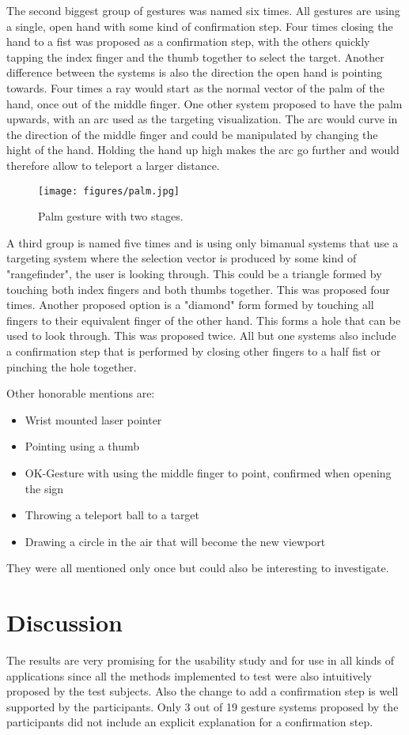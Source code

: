 The second biggest group of gestures was named six times. All gestures are using a single, open hand with some kind of confirmation step. Four times closing the hand to a fist was proposed as a confirmation step, with the others quickly tapping the index finger and the thumb together to select the target. Another difference between the systems is also the direction the open hand is pointing towards. Four times a ray would start as the normal vector of the palm of the hand, once out of the middle finger. One other system proposed to have the palm upwards, with an arc used as the targeting visualization. The arc would curve in the direction of the middle finger and could be manipulated by changing the hight of the hand. Holding the hand up high makes the arc go further and would therefore allow to teleport a larger distance.

\begin{figure}[hbt!]
    \centering
    \texttt{[image: figures/palm.jpg]}
    \caption{Palm gesture with two stages.}
    \label{fig:index2}
\end{figure}

A third group is named five times and is using only bimanual systems that use a targeting system where the selection vector is produced by some kind of "rangefinder", the user is looking through. This could be a triangle formed by touching both index fingers and both thumbs together. This was proposed four times. Another proposed option is a "diamond" form formed by touching all fingers to their equivalent finger of the other hand. This forms a hole that can be used to look through. This was proposed twice. All but one systems also include a confirmation step that is performed by closing other fingers to a half fist or pinching the hole together.

Other honorable mentions are:
\begin{itemize}
    \item Wrist mounted laser pointer
    \item Pointing using a thumb
    \item OK-Gesture with using the middle finger to point, confirmed when opening the sign
    \item Throwing a teleport ball to a target
    \item Drawing a circle in the air that will become the new viewport
\end{itemize}

They were all mentioned only once but could also be interesting to investigate.

\section{Discussion}
The results are very promising for the usability study and for use in all kinds of applications since all the methods implemented to test were also intuitively proposed by the test subjects. Also the change to add a confirmation step is well supported by the participants. Only 3 out of 19 gesture systems proposed by the participants did not include an explicit explanation for a confirmation step. 
